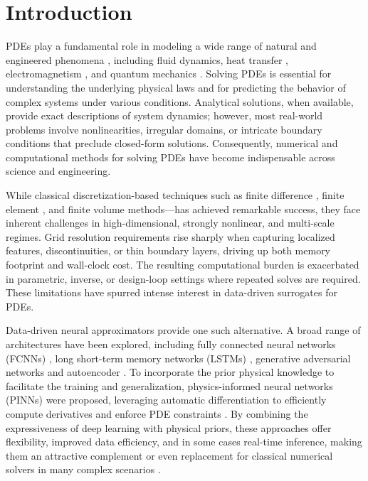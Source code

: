 \documentclass[final,3p,times]{elsarticle}
\begin{document}
\section{Introduction}
PDEs play a fundamental role in modeling a wide range of natural and engineered phenomena \cite{evans2022partial, farlow1993partial}, including fluid dynamics\cite{landau1987fluid}, heat transfer \cite{pletcher2012computational}, electromagnetism \cite{griffiths2023introduction}, and quantum mechanics \cite{griffiths2023introduction}. Solving PDEs is essential for understanding the underlying physical laws and for predicting the behavior of complex systems under various conditions. Analytical solutions, when available, provide exact descriptions of system dynamics; however, most real-world problems involve nonlinearities, irregular domains, or intricate boundary conditions that preclude closed-form solutions. Consequently, numerical and computational methods for solving PDEs have become indispensable across science and engineering. 

While classical discretization-based techniques such as finite difference \cite{smith1985numerical}, finite element \cite{zienkiewicz1971finite}, and finite volume \cite{versteeg2007introduction} methods—has achieved remarkable success, they face inherent challenges in high-dimensional, strongly nonlinear, and multi-scale regimes. Grid resolution requirements rise sharply when capturing localized features, discontinuities, or thin boundary layers, driving up both memory footprint and wall-clock cost. The resulting computational burden is exacerbated in parametric, inverse, or design-loop settings where repeated solves are required. These limitations have spurred intense interest in data-driven surrogates for PDEs.

Data-driven neural approximators provide one such alternative. A broad range of architectures have been explored, including fully connected neural networks (FCNNs) \cite{psichogios1992hybrid}, long short-term memory networks (LSTMs) \cite{xuan2023reconstruction}, generative adversarial networks \cite{kim2024prediction} and autoencoder \cite{shi2015convolutional}. To incorporate the prior physical knowledge to facilitate the training and generalization, physics-informed neural networks (PINNs) were proposed, leveraging automatic differentiation to efficiently compute derivatives and enforce PDE constraints \cite{raissi2019physics, pang2019fpinns, lu2021physics}. 
By combining the expressiveness of deep learning with physical priors, these approaches offer flexibility, improved data efficiency, and in some cases real-time inference, making them an attractive complement or even replacement for classical numerical solvers in many complex scenarios \cite{cho2023separable, raissi2018hidden}.
\end{document}
